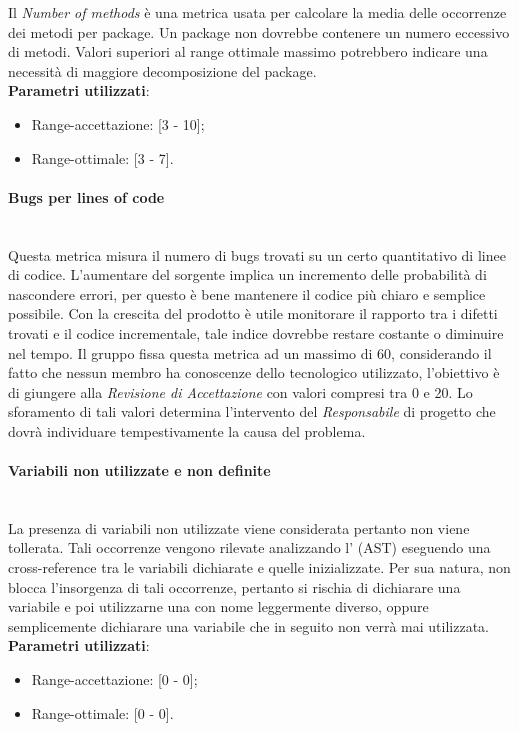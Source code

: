 			Il \emph{Number of methods} è una metrica usata per calcolare la media delle occorrenze dei metodi per package. Un package non dovrebbe contenere un numero eccessivo di metodi. Valori superiori al range ottimale massimo potrebbero indicare una necessità di maggiore decomposizione del package.\\
			\textbf{Parametri utilizzati}:
			\begin{itemize}
				\item Range-accettazione: [3 - 10];
				\item Range-ottimale: [3 - 7].
			\end{itemize}

			
			\paragraph{Bugs per lines of code}\mbox{} \\
			
			Questa metrica misura il numero di bugs trovati su un certo quantitativo di linee di codice. L'aumentare del sorgente implica un incremento delle probabilità di nascondere errori, per questo è bene mantenere il codice più chiaro e semplice possibile. Con la crescita del prodotto è utile monitorare il rapporto tra i difetti trovati e il codice incrementale, tale indice dovrebbe restare costante o diminuire nel tempo.
			Il gruppo fissa questa metrica ad un massimo di 60, considerando il fatto che nessun membro ha conoscenze dello  tecnologico utilizzato, l’obiettivo è di giungere alla \textit{Revisione di Accettazione} con valori compresi tra 0 e 20. Lo sforamento di tali valori determina l’intervento del \textit{Responsabile} di progetto che dovrà individuare tempestivamente la causa del problema.


			\paragraph{Variabili non utilizzate e non definite}\mbox{} \\
				
			La presenza di variabili non utilizzate viene considerata  pertanto non viene tollerata. Tali occorrenze vengono rilevate analizzando l' (AST) eseguendo una cross-reference tra le variabili dichiarate e quelle inizializzate. Per sua natura,  non blocca l'insorgenza di tali occorrenze, pertanto si rischia di dichiarare una variabile e poi utilizzarne una con nome leggermente diverso, oppure semplicemente dichiarare una variabile che in seguito non verrà mai utilizzata.\\
			\textbf{Parametri utilizzati}:
			\begin{itemize}
				\item Range-accettazione: [0 - 0];
				\item Range-ottimale: [0 - 0].
			\end{itemize}

